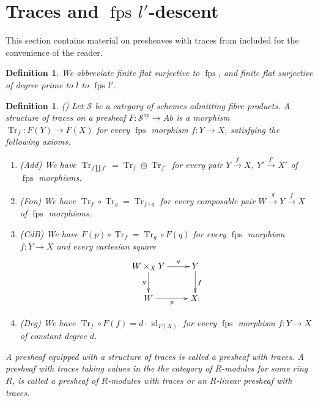 \documentclass[10pt]{amsart}
\newtheorem{defi}[theo]{Definition}
\theoremstyle{definition}
\newcommand{\cS}{\mathcal{S}}
\DeclareMathOperator{\Tr}{Tr}
\DeclareMathOperator{\id}{id}
\newcommand{\fps}{{\operatorname{fps}}}
\newcommand{\fpsl}{{\operatorname{fps\!}l'}}
\begin{document}
\section{Traces and $\fpsl$-descent} \label{sec:traces}

This section contains material on presheaves with traces from \cite{Kel17} included for the convenience of the reader.

\begin{defi}
We abbreviate finite flat surjective to $\fps$, and finite flat surjective of degree prime to $l$ to $\fpsl$.
\end{defi}

\begin{defi}{({\cite[Def.2.1.3]{Kel17}})} \label{def:traces}
Let $\cS$ be a category of schemes admitting fibre products. A \emph{structure of traces} on a presheaf $F: \cS^{op} \to Ab$ is a morphism $\Tr_f: F(Y) \to F(X)$ for every $\fps$ morphism $f: Y \to X$, satisfying the following axioms.
\begin{enumerate}
 \item {(Add)} 
 We have $\Tr_{f \amalg f'} = \Tr_f \oplus \Tr_{f'}$ for every pair $Y \stackrel{f}{\to} X$, $Y' \stackrel{f'}{\to} X'$ of $\fps$ morphisms.
 \item{(Fon)}
 We have $\Tr_f \circ \Tr_g = \Tr_{f \circ g}$ for every composable pair $W {\stackrel{g}{\to}} Y {\stackrel{f}{\to}} X$ of $\fps$ morphisms.
 \item {(CdB)} 
 We have $F(p) \circ \Tr_f = \Tr_g \circ F(q)$ for every $\fps$ morphism $f: Y \to X$ and every cartesian square
 \[ \xymatrix{
W \times_X Y \ar[r]^-q \ar[d]_g & Y \ar[d]^f \\
W \ar[r]_p & X.
 } \]
\item {(Deg)} 
We have $\Tr_f \circ F(f) = d \cdot \id_{F(X)}$ for every $\fps$ morphism $f: Y \to X$ of constant degree $d$.
\end{enumerate} 
A presheaf equipped with a structure of traces is called a \emph{presheaf with traces}. A presheaf with traces taking values in the the category of $R$-modules for some ring $R$, is called a \emph{presheaf of $R$-modules with traces} or an \emph{$R$-linear presheaf with traces}.
\end{defi}
\end{document}
